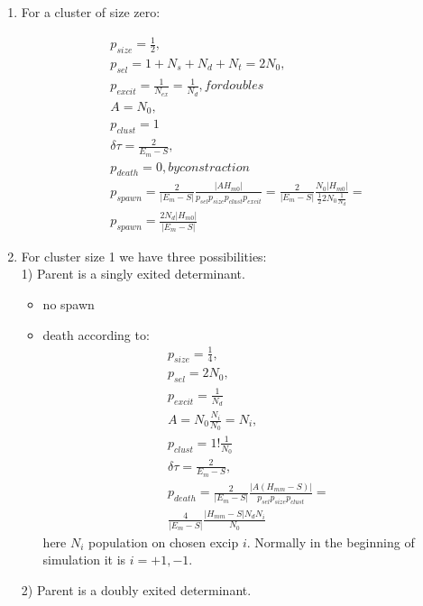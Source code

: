 \documentclass[twoside,english]{uiofysmaster}
\theoremstyle{definition}
\begin{document}
\begin{enumerate}
	\item For a cluster of size zero:
	
	\begin{align}
	p_{size} = \frac{1}{2},\\
	p_{sel} = 1+N_{s}+N_{d}+N_{t} = 2N_0,\\
	p_{excit}=\frac{1}{N_{ex}} = \frac{1}{N_d}, for doubles\\
	A = N_0,\\
	p_{clust}=1\\
	\delta \tau = \frac{2}{E_m  - S},\\
	p_{death}=0, by constraction\\
	p_{spawn} = \frac{2}{|E_m  - S|} \frac{|AH_{m0}|}{ p_{sel}  p_{size} p_{clust}p_{excit} }=
	\frac{2}{|E_m  - S|} \frac{N_0|H_{m0}|}{ \frac{1}{2}  2N_0 \frac{1}{N_d} }=\\
	p_{spawn} = \frac{2N_d|H_{m0}|}{|E_m  - S|} 
	\end{align}
	
	\item For cluster size 1 we have three possibilities:\\
	1) Parent is a singly exited determinant.
	
	\begin{itemize}
		\item no spawn
		\item death according to:
		\begin{align}
		p_{size} = \frac{1}{4},\\
		p_{sel} =  2N_0,\\
		p_{excit}= \frac{1}{N_d}\\
		A = N_0\frac{N_i}{N_0}=N_i,\\
		p_{clust}=1!\frac{1}{N_0}\\
		\delta \tau = \frac{2}{E_m  - S},\\
		p_{death} = \frac{2}{|E_m - S|} \frac{|A(H_{mm}-S)|}{ p_{sel}  p_{size} p_{clust} }=\\
		\frac{4}{|E_m  - S|} \frac{|H_{mm}-S|N_dN_i}{N_0 }
		\end{align}
		here $N_i$ population on chosen excip $i$. Normally in the beginning of simulation it is $i= +1,-1$.
	\end{itemize}
	
	2) Parent is a doubly exited determinant.
	

\end{enumerate}
\end{document}

